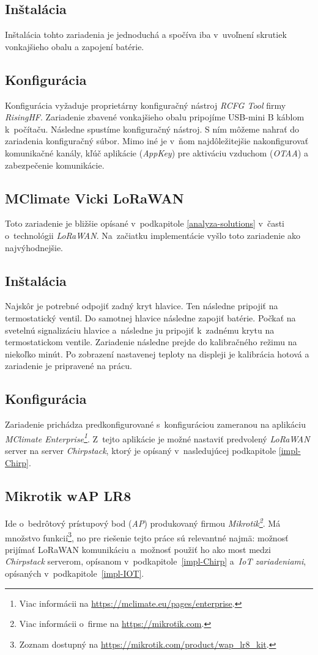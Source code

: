 \subsection*{Inštalácia}
Inštalácia tohto zariadenia je jednoduchá a spočíva iba v~uvoľnení skrutiek vonkajšieho obalu a zapojení batérie.
\subsection*{Konfigurácia}
Konfigurácia vyžaduje proprietárny konfiguračný nástroj \emph{RCFG Tool} firmy \emph{RisingHF}. Zariadenie zbavené vonkajšieho obalu pripojíme USB-mini B káblom k~počítaču. Následne spustíme konfiguračný nástroj. S ním môžeme nahrať do zariadenia konfiguračný súbor. Mimo iné je v~ňom najdôležitejšie nakonfigurovať komunikačné kanály, kľúč aplikácie (\emph{AppKey}) pre aktiváciu vzduchom (\emph{OTAA}) a zabezpečenie komunikácie. 

\subsection{MClimate Vicki LoRaWAN}\label{impl-Vicki}
Toto zariadenie je bližšie opísané v~podkapitole \ref{analyza-solutions} v~časti o~technológii \emph{LoRaWAN}. Na~začiatku implementácie vyšlo toto zariadenie ako najvýhodnejšie.
\subsection*{Inštalácia}
Najskôr je potrebné odpojiť zadný kryt hlavice. 
Ten následne pripojiť na termostatický ventil. Do samotnej hlavice následne zapojiť batérie. Počkať na svetelnú signalizáciu hlavice a~následne ju pripojiť k~zadnému  krytu na termostatickom ventile. Zariadenie následne prejde do kalibračného režimu na niekoľko minút. Po zobrazení nastavenej teploty na displeji je kalibrácia hotová a zariadenie je pripravené na prácu.
\subsection*{Konfigurácia}
Zariadenie prichádza predkonfigurované s~konfiguráciou zameranou na aplikáciu \emph{MClimate Enterprise\footnote{Viac informácii na \url{https://mclimate.eu/pages/enterprise}.}}. Z~tejto aplikácie je možné nastaviť predvolený \emph{LoRaWAN} server na server \emph{Chirpstack}, ktorý je opísaný v~nasledujúcej podkapitole \ref{impl-Chirp}.


\subsection{Mikrotik wAP LR8}
Ide o~bedrôtový prístupový bod (\emph{AP}) produkovaný firmou \emph{Mikrotik\footnote{Viac informácii o~firme na \url{https://mikrotik.com}.}}. Má množstvo funkcií\footnote{Zoznam dostupný na \url{https://mikrotik.com/product/wap_lr8_kit}.}, no pre riešenie tejto práce sú relevantné najmä: možnosť prijímať LoRaWAN komunikáciu a~možnosť použiť ho ako most medzi \emph{Chirpstack} serverom, opísanom v~podkapitole~\ref{impl-Chirp} a~\emph{IoT zariadeniami}, opísaných v~podkapitole~\ref{impl-IOT}.

